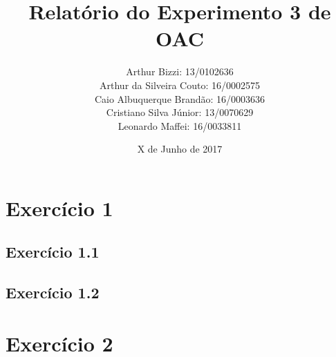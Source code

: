 \documentclass[12pt, a4paper, twoside]{article}
\begin{document}
\title{Relatório do Experimento 3 de OAC}
\author{
Arthur Bizzi: 13/0102636 \\
Arthur da Silveira Couto: 16/0002575 \\
Caio Albuquerque Brandão: 16/0003636 \\
Cristiano Silva Júnior: 13/0070629 \\
Leonardo Maffei: 16/0033811 \\}
\date{X de Junho de 2017}
\maketitle

\section{Exercício 1}

\subsection{Exercício 1.1}

\subsection{Exercício 1.2}





\section{Exercício 2}

\end{document}
